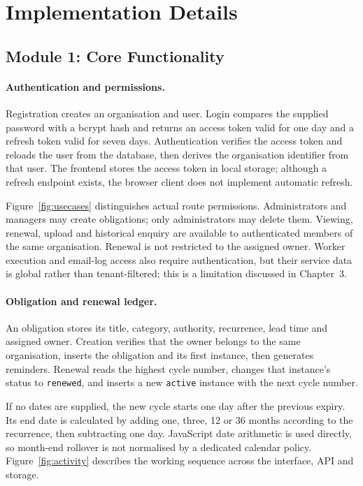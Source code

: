 \section{Implementation Details}
\subsection{Module 1: Core Functionality}
\paragraph{Authentication and permissions.}
Registration creates an organisation and user. Login compares the supplied password with a bcrypt hash and returns an access token valid for one day and a refresh token valid for seven days. Authentication verifies the access token and reloads the user from the database, then derives the organisation identifier from that user. The frontend stores the access token in local storage; although a refresh endpoint exists, the browser client does not implement automatic refresh.

Figure~\ref{fig:usecases} distinguishes actual route permissions. Administrators and managers may create obligations; only administrators may delete them. Viewing, renewal, upload and historical enquiry are available to authenticated members of the same organisation. Renewal is not restricted to the assigned owner. Worker execution and email-log access also require authentication, but their service data is global rather than tenant-filtered; this is a limitation discussed in Chapter~3.

\paragraph{Obligation and renewal ledger.}
An obligation stores its title, category, authority, recurrence, lead time and assigned owner. Creation verifies that the owner belongs to the same organisation, inserts the obligation and its first instance, then generates reminders. Renewal reads the highest cycle number, changes that instance's status to \texttt{renewed}, and inserts a new \texttt{active} instance with the next cycle number.

If no dates are supplied, the new cycle starts one day after the previous expiry. Its end date is calculated by adding one, three, 12 or 36 months according to the recurrence, then subtracting one day. JavaScript date arithmetic is used directly, so month-end rollover is not normalised by a dedicated calendar policy. Figure~\ref{fig:activity} describes the working sequence across the interface, API and storage.

